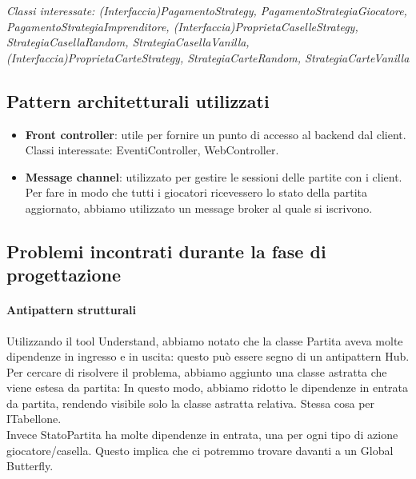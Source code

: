 \documentclass{article}
\begin{document}
\begin{itemize}
        \textit{Classi interessate: (Interfaccia)PagamentoStrategy, PagamentoStrategiaGiocatore, PagamentoStrategiaImprenditore, (Interfaccia)ProprietaCaselleStrategy, StrategiaCasellaRandom, StrategiaCasellaVanilla, (Interfaccia)ProprietaCarteStrategy, StrategiaCarteRandom, StrategiaCarteVanilla}
    \end{itemize}

\subsection{Pattern architetturali utilizzati}
    \begin{itemize}
        \item \textbf{Front controller}: utile per fornire un punto di accesso al backend dal client. Classi interessate: EventiController, WebController.
        \item \textbf{Message channel}: utilizzato per gestire le sessioni delle partite con i client. Per fare in modo che tutti i giocatori ricevessero lo stato della partita aggiornato, abbiamo utilizzato un message broker al quale si iscrivono.
    \end{itemize}


\subsection{Problemi incontrati durante la fase di progettazione}
\paragraph{Antipattern strutturali}
Utilizzando il tool Understand, abbiamo notato che la classe Partita aveva molte dipendenze in ingresso e in uscita: questo può essere segno di un antipattern Hub. Per cercare di risolvere il problema, abbiamo aggiunto una classe astratta che viene estesa da partita: In questo modo, abbiamo ridotto le dipendenze in entrata da partita, rendendo visibile solo la classe astratta relativa. Stessa cosa per ITabellone.
\\Invece StatoPartita ha molte dipendenze in entrata, una per ogni tipo di azione 
giocatore/casella. Questo implica che ci potremmo trovare davanti a un Global Butterfly.

\paragraph{}
\end{document}
